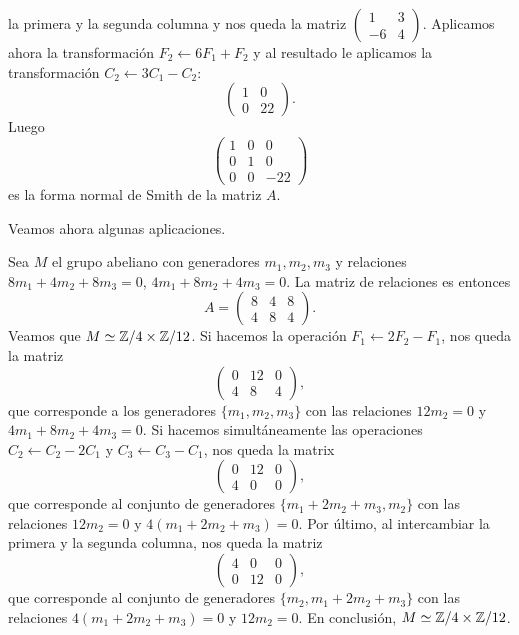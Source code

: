 \begin{example}
la primera y la segunda columna y nos queda la matriz
$\begin{pmatrix}1&3\\-6&4\end{pmatrix}$. Aplicamos ahora la transformación
$F_2\leftarrow 6F_1+F_2$ y al resultado le aplicamos la transformación $C_2\leftarrow 3C_1-C_2$:
\[
\begin{pmatrix}
    1 & 0\\
    0 & 22
\end{pmatrix}.
\]
Luego
\[
\begin{pmatrix}
	1 & 0 & 0\\
	0 & 1 & 0\\
	0 & 0 & -22	
\end{pmatrix}
\]
es la forma normal de Smith de la matriz $A$.
\end{example}

Veamos ahora algunas aplicaciones.

\begin{example}
Sea $M$ el grupo abeliano con generadores $m_1,m_2,m_3$ y relaciones
$8m_1+4m_2+8m_3=0$, $4m_1+8m_2+4m_3=0$. La matriz de relaciones es entonces
\[
A=\begin{pmatrix}
8 & 4 & 8\\
4 & 8 & 4
\end{pmatrix}.
\]	
Veamos que $M\simeq\mathbb{Z}/4\times\mathbb{Z}/{12}$. Si hacemos la operación $F_1\leftarrow 2F_2-F_1$, nos queda la matriz
\[
\begin{pmatrix}
0 & 12 & 0\\
4 & 8 & 4	
\end{pmatrix},
\]
que corresponde a los generadores $\{m_1,m_2,m_3\}$ con las relaciones $12m_2=0$ y $4m_1+8m_2+4m_3=0$. Si 
hacemos simultáneamente las operaciones $C_2\leftarrow C_2-2C_1$ y $C_3\leftarrow C_3-C_1$, nos queda 
la matrix
\[
\begin{pmatrix}
0 & 12 & 0\\
4 & 0 & 0	
\end{pmatrix},
\]
que corresponde al conjunto de generadores $\{m_1+2m_2+m_3,m_2\}$ con las relaciones $12m_2=0$ y $4(m_1+2m_2+m_3)=0$. 
Por último, al intercambiar
la primera y la segunda columna, nos queda la matriz 
\[
\begin{pmatrix}
4 & 0 & 0\\
0 & 12 & 0	
\end{pmatrix},
\]
que corresponde al conjunto de generadores $\{m_2,m_1+2m_2+m_3\}$ con las relaciones $4(m_1+2m_2+m_3)=0$ y $12m_2=0$. 
En conclusión, $M\simeq\mathbb{Z}/4\times\mathbb{Z}/{12}$. 
\end{example}


